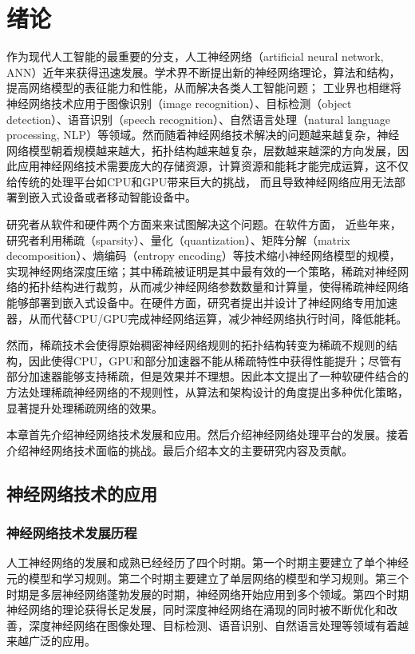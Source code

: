 \chapter{绪论}

作为现代人工智能的最重要的分支，人工神经网络（artificial neural network, ANN）近年来获得迅速发展。学术界不断提出新的神经网络理论，算法和结构，提高网络模型的表征能力和性能，从而解决各类人工智能问题；
工业界也相继将神经网络技术应用于图像识别（image recognition）、目标检测（object detection）、语音识别（speech recognition）、自然语言处理（natural language processing, NLP）等领域。然而随着神经网络技术解决的问题越来越复杂，神经网络模型朝着规模越来越大，拓扑结构越来越复杂，层数越来越深的方向发展，因此应用神经网络技术需要庞大的存储资源，计算资源和能耗才能完成运算，这不仅给传统的处理平台如CPU和GPU带来巨大的挑战， 而且导致神经网络应用无法部署到嵌入式设备或者移动智能设备中。

研究者从软件和硬件两个方面来来试图解决这个问题。在软件方面， 近些年来，研究者利用稀疏（sparsity）、量化（quantization）、矩阵分解（matrix decomposition）、熵编码（entropy encoding）等技术缩小神经网络模型的规模，实现神经网络深度压缩；其中稀疏被证明是其中最有效的一个策略，稀疏对神经网络的拓扑结构进行裁剪，从而减少神经网络参数数量和计算量，使得稀疏神经网络能够部署到嵌入式设备中。在硬件方面，研究者提出并设计了神经网络专用加速器，从而代替CPU/GPU完成神经网络运算，减少神经网络执行时间，降低能耗。

然而，稀疏技术会使得原始稠密神经网络规则的拓扑结构转变为稀疏不规则的结构，因此使得CPU，GPU和部分加速器不能从稀疏特性中获得性能提升；尽管有部分加速器能够支持稀疏，但是效果并不理想。因此本文提出了一种软硬件结合的方法处理稀疏神经网络的不规则性，从算法和架构设计的角度提出多种优化策略，显著提升处理稀疏网络的效果。

本章首先介绍神经网络技术发展和应用。然后介绍神经网络处理平台的发展。接着介绍神经网络技术面临的挑战。最后介绍本文的主要研究内容及贡献。

\section{神经网络技术的应用}

\subsection{神经网络技术发展历程}

人工神经网络的发展和成熟已经经历了四个时期。第一个时期主要建立了单个神经元的模型和学习规则。第二个时期主要建立了单层网络的模型和学习规则。第三个时期是多层神经网络蓬勃发展的时期，神经网络开始应用到多个领域。第四个时期神经网络的理论获得长足发展，同时深度神经网络在涌现的同时被不断优化和改善，深度神经网络在图像处理、目标检测、语音识别、自然语言处理等领域有着越来越广泛的应用。

